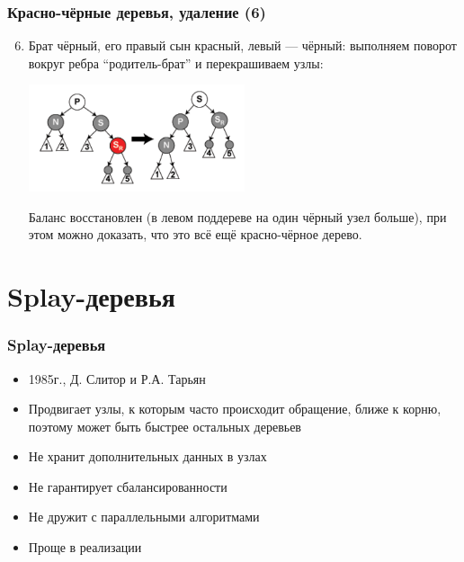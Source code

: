\documentclass{../../slides-style}
\begin{document}
    \begin{frame}
        \frametitle{Красно-чёрные деревья, удаление (6)}
        \begin{enumerate}
            \setcounter{enumi}{5}
            \item Брат чёрный, его правый сын красный, левый --- чёрный: выполняем поворот вокруг ребра ``родитель-брат'' и перекрашиваем узлы:
            \begin{center}
                \includegraphics[width=0.5\textwidth]{deletion-from-red-black-tree5.png}
            \end{center}
            Баланс восстановлен (в левом поддереве на один чёрный узел больше), при этом можно доказать, что это всё ещё красно-чёрное дерево.
        \end{enumerate}
    \end{frame}

    \section{Splay-деревья}

    \begin{frame}
        \frametitle{Splay-деревья}
        \begin{itemize}
            \item 1985г., Д. Слитор и Р.А. Тарьян
            \item Продвигает узлы, к которым часто происходит обращение, ближе к корню, поэтому может быть быстрее остальных деревьев
            \item Не хранит дополнительных данных в узлах
            \item Не гарантирует сбалансированности
            \item Не дружит с параллельными алгоритмами
            \item Проще в реализации
        \end{itemize}
    \end{frame}
\end{document}
